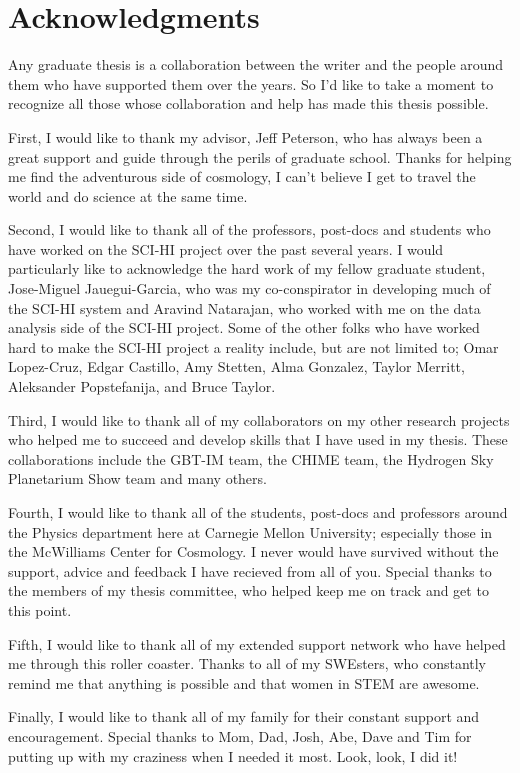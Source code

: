 \section*{Acknowledgments}

Any graduate thesis is a collaboration between the writer and the people around them who have supported them over the years. So I'd like to take a moment to recognize all those whose collaboration and help has made this thesis possible. 

First, I would like to thank my advisor, Jeff Peterson, who has always been a great support and guide through the perils of graduate school. Thanks for helping me find the adventurous side of cosmology, I can't believe I get to travel the world and do science at the same time.

Second, I would like to thank all of the professors, post-docs and students who have worked on the SCI-HI project over the past several years. I would particularly like to acknowledge the hard work of my fellow graduate student, Jose-Miguel Jauegui-Garcia, who was my co-conspirator in developing much of the SCI-HI system and Aravind Natarajan, who worked with me on the data analysis side of the SCI-HI project. Some of the other folks who have worked hard to make the SCI-HI project a reality include, but are not limited to; Omar Lopez-Cruz, Edgar Castillo, Amy Stetten, Alma Gonzalez, Taylor Merritt, Aleksander Popstefanija, and Bruce Taylor. 

Third, I would like to thank all of my collaborators on my other research projects who helped me to succeed and develop skills that I have used in my thesis. These collaborations include the GBT-IM team, the CHIME team, the Hydrogen Sky Planetarium Show team and many others. 

Fourth, I would like to thank all of the students, post-docs and professors around the Physics department here at Carnegie Mellon University; especially those in the McWilliams Center for Cosmology. I never would have survived without the support, advice and feedback I have recieved from all of you. Special thanks to the members of my thesis committee, who helped keep me on track and get to this point. 

Fifth, I would like to thank all of my extended support network who have helped me through this roller coaster. Thanks to all of my SWEsters, who constantly remind me that anything is possible and that women in STEM are awesome. 

Finally, I would like to thank all of my family for their constant support and encouragement. Special thanks to Mom, Dad, Josh, Abe, Dave and Tim for putting up with my craziness when I needed it most. Look, look, I did it!

